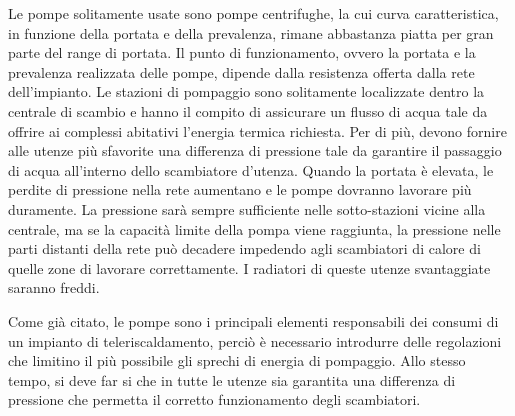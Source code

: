 \documentclass[laurea,oneside,11pt]{USiena_tesiLM}
\begin{document}
Le pompe solitamente usate sono pompe centrifughe, la cui curva caratteristica, in funzione della portata e della prevalenza, rimane abbastanza piatta per gran parte del range di portata. 
Il punto di funzionamento, ovvero la portata e la prevalenza realizzata delle pompe, dipende dalla resistenza offerta dalla rete dell'impianto. 
Le stazioni di pompaggio sono solitamente localizzate dentro la centrale di scambio e hanno il compito di assicurare un flusso di acqua tale da offrire ai complessi abitativi l'energia termica richiesta. Per di più, devono fornire alle utenze più sfavorite una differenza di pressione tale da garantire il passaggio di acqua all'interno dello scambiatore d'utenza. 
Quando la portata è elevata, le perdite di pressione nella rete aumentano e le pompe dovranno lavorare più duramente. La pressione sarà sempre sufficiente nelle sotto-stazioni vicine alla centrale, ma se la capacità limite della pompa viene raggiunta, la pressione nelle parti distanti della rete  può decadere impedendo agli scambiatori di calore di quelle zone di lavorare correttamente. I radiatori di queste utenze svantaggiate saranno freddi.

Come già citato, le pompe sono i principali elementi responsabili dei consumi di un impianto di teleriscaldamento, perciò è necessario introdurre delle regolazioni che limitino il più possibile gli sprechi di energia di pompaggio. Allo stesso tempo, si deve far si che in tutte le utenze sia garantita una differenza di pressione che permetta il corretto funzionamento degli scambiatori. 
\end{document}
